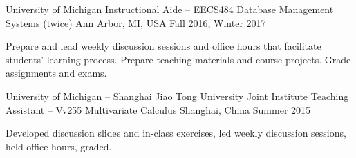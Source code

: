 \begin{cventries}

\cventry
  {University of Michigan} %
  {Instructional Aide – EECS484 Database Management Systems (twice)} %
  {Ann Arbor, MI, USA} %
  {Fall 2016, Winter 2017} %
  {
    \begin{cvitems} %
      \item {Prepare and lead weekly discussion sessions and office hours that facilitate students' learning process. Prepare teaching materials and course projects. Grade assignments and exams.}
    \end{cvitems}
  }

\cventry
  {University of Michigan – Shanghai Jiao Tong University Joint Institute} %
  {Teaching Assistant – Vv255 Multivariate Calculus} %
  {Shanghai, China} %
  {Summer 2015} %
  {
    \begin{cvitems} %
      \item {Developed discussion slides and in-class exercises, led weekly discussion sessions, held office hours, graded.}
    \end{cvitems}
  }

\end{cventries}